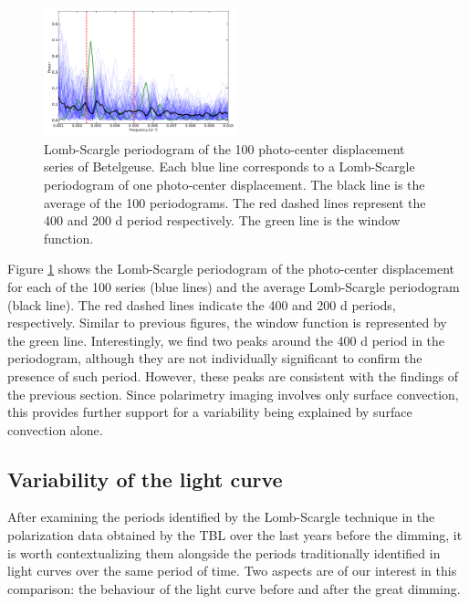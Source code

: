 \documentclass{aa}
\begin{document}
\begin{figure}[!h]
    \centering
    \includegraphics[width=0.5\textwidth]{Lomb-Scargle Photo-center.pdf}
    \caption{Lomb-Scargle periodogram of the 100 photo-center displacement series of Betelgeuse. Each blue line corresponds to a Lomb-Scargle periodogram of one photo-center
     displacement. The black line is the average of the 100 periodograms. The red dashed lines represent the 400 and 200 d period respectively. The green line is the window function.}
    \label{LS photocenter}
\end{figure}

Figure \ref{LS photocenter} shows the Lomb-Scargle periodogram of the photo-center displacement for each of the 100 series (blue lines) and the average Lomb-Scargle periodogram (black line). 
The red dashed lines indicate the 400 and 
200 d periods, respectively. Similar to previous figures, the window function is represented by the green line. Interestingly, we find two peaks around the 400 d period in the periodogram, although they are not individually significant to confirm the presence of such period. However, these peaks are consistent with the findings of the previous section. Since polarimetry imaging involves only surface convection, this provides further support for a variability being explained by surface convection alone.


\subsection{Variability of the light curve}

After examining the periods identified by the Lomb-Scargle technique in the polarization data obtained by the TBL over the last years before the dimming, it is worth contextualizing them alongside the periods traditionally identified in light curves over the same period of time. Two aspects 
are of our interest in this comparison: the behaviour of the light curve before and after the great dimming.
\end{document}
